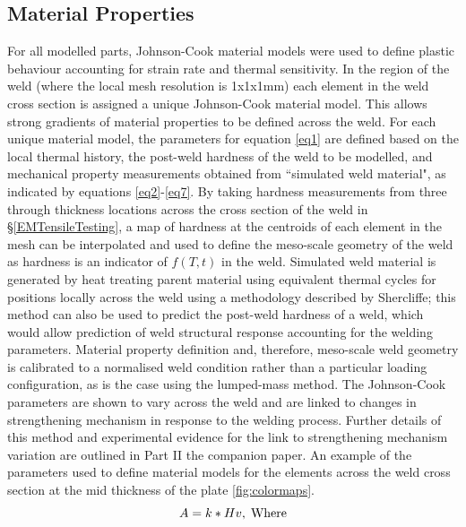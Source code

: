 \subsection{Material Properties}
\label{FEMaterialProperties}
For all modelled parts, Johnson-Cook material models were used to define plastic behaviour accounting for strain rate and thermal sensitivity. In the region of the weld (where the local mesh resolution is 1x1x1mm) each element in the weld cross section is assigned a unique Johnson-Cook material model. This allows strong gradients of material properties to be defined across the weld. For each unique material model, the parameters for equation \ref{eq1} are defined based on the local thermal history, the post-weld hardness of the weld to be modelled, and mechanical property measurements obtained from ``simulated weld material", as indicated by equations \ref{eq2}-\ref{eq7}. By taking hardness measurements from three through thickness locations across the cross section of the weld in \S\ref{EMTensileTesting}, a map of hardness at the centroids of each element in the mesh can be interpolated and used to define the meso-scale geometry of the weld as hardness is an indicator of $f(T,t)$ in the weld. Simulated weld material is generated by heat treating parent material using equivalent thermal cycles for positions locally across the weld using a methodology described by Shercliffe; this method can also be used to predict the post-weld hardness of a weld, which would allow prediction of weld structural response accounting for the welding parameters. Material property definition and, therefore, meso-scale weld geometry is calibrated to a normalised weld condition rather than a particular loading configuration, as is the case using the lumped-mass method. The Johnson-Cook parameters are shown to vary across the weld and are linked to changes in strengthening mechanism in response to the welding process. Further details of this method and experimental evidence for the link to strengthening mechanism variation are outlined in Part II the companion paper. An example of the parameters used to define material models for the elements across the weld cross section at the mid thickness of the plate \ref{fig:colormaps}.
\begin{equation}
\label{eq2}
A=k*Hv, \textrm{\;Where}
\end{equation}
